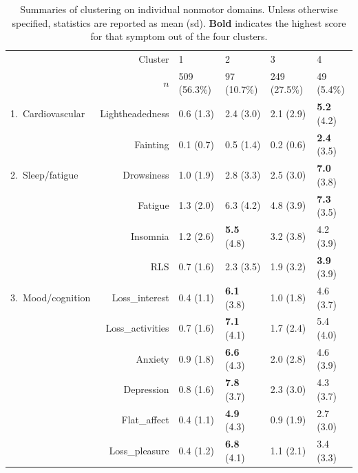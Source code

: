 \documentclass[preprint,5p]{elsarticle} %
\begin{document}
\begin{table}[t]
  \centering
  \caption{Summaries of clustering on individual nonmotor domains. Unless otherwise specified,
    statistics are reported as mean (sd). \textbf{Bold} indicates the highest score for that
  symptom out of the four clusters.}
  \label{tab:nms30}
  \begin{threeparttable}
  \small
\begin{tabular}{lrllll}
  \toprule
    & Cluster & 1 & 2 & 3 & 4 \\
    & $n$ & 509 (56.3\%) & 97 (10.7\%) & 249 (27.5\%) & 49 (5.4\%) \\
  \midrule
  1.\ Cardiovascular &
  Lightheadedness & 0.6 (1.3)\tnote{234} & 2.4 (3.0)\tnote{14} & 2.1 (2.9)\tnote{14} & \textbf{5.2}
  (4.2)\tnote{123} \\
  &Fainting & 0.1 (0.7)\tnote{24} & 0.5 (1.4)\tnote{134} & 0.2 (0.6)\tnote{24} & \textbf{2.4}
  (3.5)\tnote{123} \\
  \midrule
  2.\ Sleep/fatigue &
  Drowsiness & 1.0 (1.9)\tnote{234} & 2.8 (3.3)\tnote{14} & 2.5 (3.0)\tnote{14} & \textbf{7.0}
  (3.8)\tnote{123} \\
  &Fatigue & 1.3 (2.0)\tnote{234} & 6.3 (4.2)\tnote{13} & 4.8 (3.9)\tnote{124} & \textbf{7.3} (3.5)\tnote{13} \\
  &Insomnia & 1.2 (2.6)\tnote{234} & \textbf{5.5} (4.8)\tnote{13} & 3.2 (3.8)\tnote{12} & 4.2
  (3.9)\tnote{1} \\
  &RLS & 0.7 (1.6)\tnote{234} & 2.3 (3.5)\tnote{14} & 1.9 (3.2)\tnote{14} & \textbf{3.9}
  (3.9)\tnote{123} \\
  \midrule
  3.\ Mood/cognition &
  Loss\_interest & 0.4 (1.1)\tnote{234} & \textbf{6.1} (3.8)\tnote{134} & 1.0 (1.8)\tnote{124} & 4.6 (3.7)\tnote{123} \\
  &Loss\_activities & 0.7 (1.6)\tnote{234} & \textbf{7.1} (4.1)\tnote{134} & 1.7 (2.4)\tnote{124} &
  5.4 (4.0)\tnote{123} \\
  &Anxiety & 0.9 (1.8)\tnote{234} & \textbf{6.6} (4.3)\tnote{134} & 2.0 (2.8)\tnote{124} & 4.6 (3.9)\tnote{123} \\
  &Depression & 0.8 (1.6)\tnote{234} & \textbf{7.8} (3.7)\tnote{134} & 2.3 (3.0)\tnote{124} & 4.3 (3.7)\tnote{123} \\
  &Flat\_affect & 0.4 (1.1)\tnote{234} & \textbf{4.9} (4.3)\tnote{134} & 0.9 (1.9)\tnote{124} & 2.7 (3.0)\tnote{123} \\
  &Loss\_pleasure & 0.4 (1.2)\tnote{234} & \textbf{6.8} (4.1)\tnote{134} & 1.1 (2.1)\tnote{124} & 3.4 (3.3)\tnote{123} \\

\end{tabular}
\end{threeparttable}
\end{table}
\end{document}
